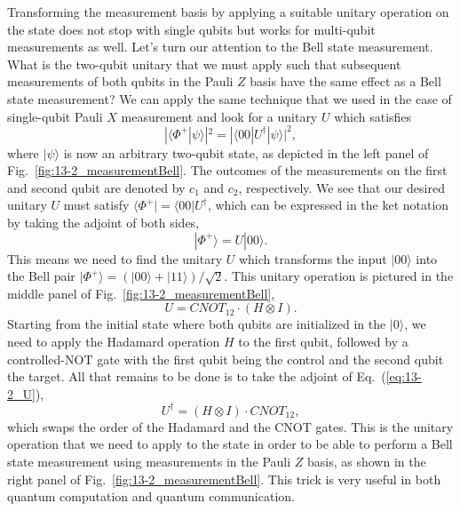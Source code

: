 Transforming the measurement basis by applying a suitable unitary operation on the state does not stop with single qubits but works for multi-qubit measurements as well.
Let's turn our attention to the Bell state measurement.
What is the two-qubit unitary that we must apply such that subsequent measurements of both qubits in the Pauli $Z$ basis have the same effect as a Bell state measurement?
We can apply the same technique that we used in the case of single-qubit Pauli $X$ measurement and look for a unitary $U$ which satisfies
\begin{equation}
    |\langle\Phi^+|\psi\rangle|^2 = |\langle00|U^{\dagger}|\psi\rangle|^2,
\end{equation}
where $|\psi\rangle$ is now an arbitrary two-qubit state, as depicted in the left panel of Fig.~\ref{fig:13-2_measurementBell}.
The outcomes of the measurements on the first and second qubit are denoted by $c_1$ and $c_2$, respectively.
We see that our desired unitary $U$ must satisfy $\langle\Phi^+| = \langle00|U^{\dagger}$, which can be expressed in the ket notation by taking the adjoint of both sides,
\begin{equation}
    |\Phi^+\rangle = U |00\rangle.
\end{equation}
This means we need to find the unitary $U$ which transforms the input $|00\rangle$ into the Bell pair $|\Phi^+\rangle = (|00\rangle + |11\rangle) / \sqrt{2}$.
This unitary operation is pictured in the middle panel of Fig.~\ref{fig:13-2_measurementBell},
\begin{equation}
    U = CNOT_{12} \cdot (H \otimes I).
    \label{eq:13-2_U}
\end{equation}
Starting from the initial state where both qubits are initialized in the $|0\rangle$, we need to apply the Hadamard operation $H$ to the first qubit, followed by a controlled-NOT gate with the first qubit being the control and the second qubit the target.
All that remains to be done is to take the adjoint of Eq.~(\ref{eq:13-2_U}),
\begin{equation}
    U^{\dagger} = (H \otimes I) \cdot CNOT_{12},
\end{equation}
which swaps the order of the Hadamard and the CNOT gates.
This is the unitary operation that we need to apply to the state \ket{\psi} in order to be able to perform a Bell state measurement using measurements in the Pauli $Z$ basis, as shown in the right panel of Fig.~\ref{fig:13-2_measurementBell}.
This trick is very useful in both quantum computation and quantum communication.

